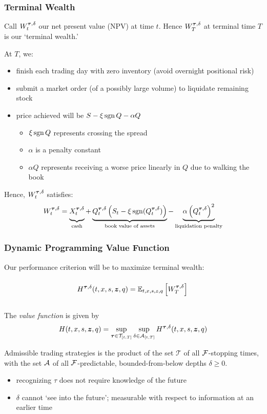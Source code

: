 \begin{frame}
\frametitle{Terminal Wealth}
Call $W^{\bm{\tau}, \delta}_t$ our net present value (NPV) at time $t$.
Hence $W^{\bm{\tau}, \delta}_T$ at terminal time $T$ is our `terminal wealth.' 

At $T$, we:
\begin{itemize}
\item finish each trading day with zero inventory (avoid overnight positional risk)
\item submit a market order (of a possibly large volume) to liquidate remaining stock
\item price achieved will be $S - \xi \operatorname{\mathrm{sgn}} Q - \alpha Q$
\begin{itemize}
\item $\xi \operatorname{\mathrm{sgn}} Q$ represents crossing the spread
\item $\alpha$ is a penalty constant
\item $\alpha Q$ represents receiving a worse price linearly in $Q$ due to walking the book
\end{itemize}
\end{itemize}

Hence, $W^{\bm{\tau}, \delta}_t$ satisfies:
\[
W^{\btau, \delta}_t = \underbrace{\vphantom{\left( Q^{\btau, \delta}_t) \right)}X^{\btau, \delta}_t}_{\text{cash}}+ \underbrace{Q^{\btau, \delta}_t \left( S_t - \xi \sgn(Q^{\btau, \delta}_t) \right)}_{\text{book value of assets}} - \underbrace{\alpha \left( Q^{\btau, \delta}_t \right)^2}_{\text{liquidation penalty}}
\]
\end{frame}

\begin{frame}
\frametitle{Dynamic Programming Value Function}
Our performance criterion will be to maximize terminal wealth:
\[
H^{\bm{\tau}, \delta}(t,x,s,\bm{z},q) = \mathbb{E}_{t,x,s,z,q} \left[ W_T^{\bm{\tau}, \delta} \right]\vphantom{\int\limits_t^T}
\]

The \emph{value function} is given by
\[
H(t,x,s,\bm{z},q) = \sup\limits_{\bm{\tau} \in \mathcal{T}_{[t,T]}} \sup\limits_{\delta \in \mathcal{A}_{[t,T]}} H^{\bm{\tau}, \delta}(t,x,s,\bm{z},q)
\]

Admissible trading strategies is the product of the set $\mathcal{T}$ of all $\mathcal{F}$-stopping times, with the set $\mathcal{A}$ of all $\mathcal{F}$-predictable, bounded-from-below depths $\delta \geq 0$.
\begin{itemize}
\item recognizing $\tau$ does not require knowledge of the future
\item $\delta$ cannot `see into the future'; measurable with respect to information at an earlier time
\end{itemize}
\end{frame}

